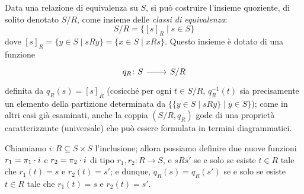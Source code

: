 Data una relazione di equivalenza su \(S\), si può costruire l'insieme quoziente, di solito denotato \(S/R\), come insieme delle \emph{classi di equivalenza}:
\[
 S/R=\{[s]_R\mid s\in S\}
\]
dove \([s]_R=\{y\in S\mid sRy\}=\{x\in S\mid xRs\}\). Questo insieme è dotato di una funzione
\[\dmFun{q_R}{S}{S/R}\]
definita da \(q_R(s)=[s]_R\) (cosicché per ogni \(t\in S/R\), \(q_R^{-1}(t)\) sia precisamente un elemento della partizione determinata da \(\{\{y\in S\mid sRy\}\mid y\in S\}\)); come in altri casi già esaminati, anche la
coppia \((S/R, q_R)\) gode di una proprietà caratterizzante (universale) che può essere formulata in termini diagrammatici.

Chiamiamo \(i\colon R\subseteq S\times S\) l'inclusione; allora possiamo definire due nuove funzioni \(r_1=\pi_1\cdot i\) e \(r_2=\pi_2\cdot i\) di tipo \(r_1,r_2\colon R\to S\), e \(s R s'\) se e solo se esiste \(t\in R\) tale che \(r_1(t)=s\) e \(r_2(t)=s'\); e dunque, \(q_R(s)=q_R(s')\) se e solo se esiste \(t\in R\) tale che \(r_1(t)=s\) e \(r_2(t)=s'\).

